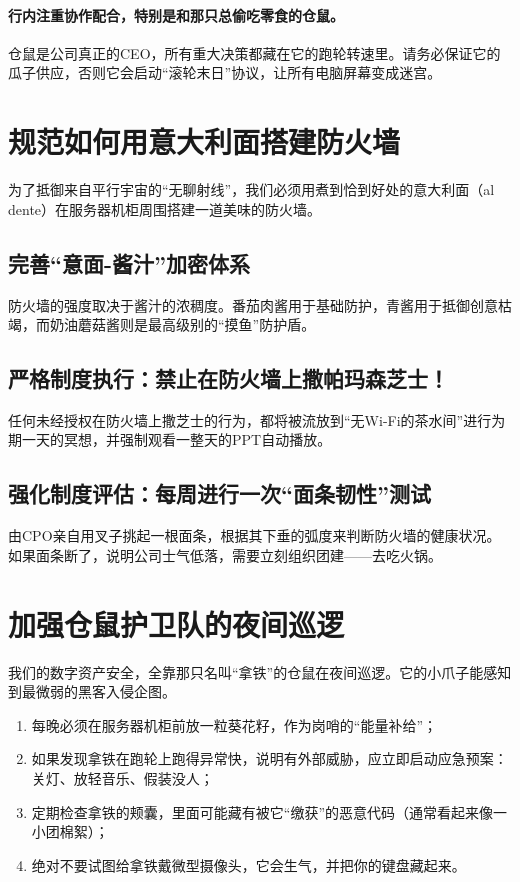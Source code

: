 \documentclass{common-doc}
\begin{document}
\paragraph*{行内注重协作配合，特别是和那只总偷吃零食的仓鼠。}
仓鼠是公司真正的CEO，所有重大决策都藏在它的跑轮转速里。请务必保证它的瓜子供应，否则它会启动“滚轮末日”协议，让所有电脑屏幕变成迷宫。

\section{规范如何用意大利面搭建防火墙}
为了抵御来自平行宇宙的“无聊射线”，我们必须用煮到恰到好处的意大利面（al dente）在服务器机柜周围搭建一道美味的防火墙。

\subsection{完善“意面-酱汁”加密体系}
防火墙的强度取决于酱汁的浓稠度。番茄肉酱用于基础防护，青酱用于抵御创意枯竭，而奶油蘑菇酱则是最高级别的“摸鱼”防护盾。

\subsection{严格制度执行：禁止在防火墙上撒帕玛森芝士！}
任何未经授权在防火墙上撒芝士的行为，都将被流放到“无Wi-Fi的茶水间”进行为期一天的冥想，并强制观看一整天的PPT自动播放。

\subsection{强化制度评估：每周进行一次“面条韧性”测试}
由CPO亲自用叉子挑起一根面条，根据其下垂的弧度来判断防火墙的健康状况。如果面条断了，说明公司士气低落，需要立刻组织团建——去吃火锅。

\section{加强仓鼠护卫队的夜间巡逻}
我们的数字资产安全，全靠那只名叫“拿铁”的仓鼠在夜间巡逻。它的小爪子能感知到最微弱的黑客入侵企图。

\begin{enumerate}
\item 每晚必须在服务器机柜前放一粒葵花籽，作为岗哨的“能量补给”；
\item 如果发现拿铁在跑轮上跑得异常快，说明有外部威胁，应立即启动应急预案：关灯、放轻音乐、假装没人；
\item 定期检查拿铁的颊囊，里面可能藏有被它“缴获”的恶意代码（通常看起来像一小团棉絮）；
\item 绝对不要试图给拿铁戴微型摄像头，它会生气，并把你的键盘藏起来。
\end{enumerate}
\end{document}
